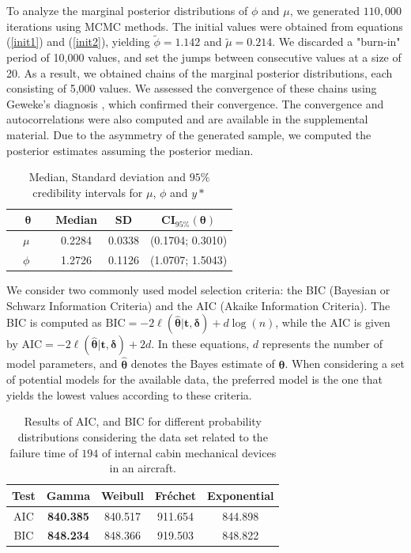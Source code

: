 \documentclass[12pt]{article} %
\theoremstyle{plain}%
\theoremstyle{definition}
\theoremstyle{remark}
\begin{document}
To analyze the marginal posterior distributions of $\phi$ and $\mu$, we generated $110,000$ iterations using MCMC methods. The initial values were obtained from equations (\ref{init1}) and (\ref{init2}), yielding $\tilde{\phi}=1.142$ and $\tilde{\mu}=0.214$. We discarded a "burn-in" period of 10,000 values, and set the jumps between consecutive values at a size of 20. As a result, we obtained chains of the marginal posterior distributions, each consisting of 5,000 values. We assessed the convergence of these chains using Geweke's diagnosis \cite{geweke1991evaluating}, which confirmed their convergence. The convergence and autocorrelations were also computed and are available in the supplemental material. Due to the asymmetry of the generated sample, we computed the posterior estimates assuming the posterior median.
\begin{table}[!h]
	\caption{Median, Standard deviation and  $95\%$ credibility intervals for $\mu$, $\phi$ and $y*$}
	\centering %
{\small
	{\begin{tabular}{ c | c |  c| c }
			\hline
			$\boldsymbol{\theta}$  & Median & SD & CI$_{95\%}(\boldsymbol{\theta})$ \\ \hline
			\ \ $\mu$ \ \   & 0.2284 &  0.0338  &  (0.1704; 0.3010)  \\ \hline
			\ \ $\phi$   \ \  &  1.2726 & 0.1126 &  (1.0707; 1.5043) \\ \hline
		\end{tabular}}\label{resairplane} }
\end{table}

We consider two commonly used model selection criteria: the BIC (Bayesian or Schwarz Information Criteria) and the AIC (Akaike Information Criteria). The BIC is computed as $\text{BIC} = -2 \ell(\hat{\boldsymbol{\theta}}|\boldsymbol{t,\delta}) + d\log(n)$, while the AIC is given by $\text{AIC} = -2 \ell(\hat{\boldsymbol{\theta}}|\boldsymbol{t,\delta}) + 2d$. In these equations, $d$ represents the number of model parameters, and $\hat{\boldsymbol{\theta}}$ denotes the Bayes estimate of $\boldsymbol{\theta}$. When considering a set of potential models for the available data, the preferred model is the one that yields the lowest values according to these criteria.

\begin{table}[!h]
\centering %
	\caption{Results of AIC, and BIC for different probability distributions considering the data set related to the failure time of $194$ of internal cabin mechanical devices in an aircraft.}

	{\begin{tabular}{c|c|c|c|c}
			\hline
			Test   &  Gamma & Weibull & Fréchet & Exponential \\ \hline
			AIC    & \textbf{840.385} & 840.517 & 911.654 & 844.898 \\ 
			BIC    & \textbf{848.234} & 848.366 & 919.503 & 848.822  \\ \hline
		\end{tabular}}\label{discairplane}
\end{table}
\end{document}
